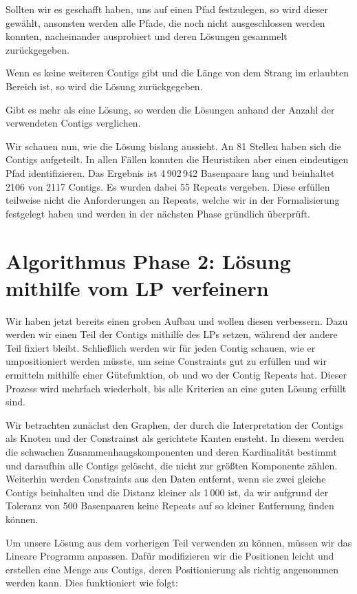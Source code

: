 Sollten wir es geschafft haben, uns auf einen Pfad festzulegen, so wird dieser gewählt, ansonsten werden alle Pfade, die noch nicht ausgeschlossen werden konnten, nacheinander ausprobiert und deren Lösungen gesammelt zurückgegeben.

Wenn es keine weiteren Contigs gibt und die Länge von dem Strang im erlaubten Bereich ist, so wird die Lösung zurückgegeben.

Gibt es mehr als eine Lösung, so werden die Lösungen anhand der Anzahl der verwendeten Contigs verglichen. 

Wir schauen nun, wie die Lösung bislang aussieht. An 81 Stellen haben sich die Contigs aufgeteilt. In allen Fällen konnten die Heuristiken aber einen eindeutigen Pfad identifizieren. Das Ergebnis ist 4\,902\,942 Basenpaare lang und beinhaltet 2106 von 2117 Contigs. Es wurden dabei 55 Repeats vergeben. Diese erfüllen teilweise nicht die Anforderungen an Repeats, welche wir in der Formalisierung festgelegt haben und werden in der nächsten Phase gründlich überprüft.


\chapter{Algorithmus Phase 2: Lösung mithilfe vom LP verfeinern}\raggedbottom 
Wir haben jetzt bereits einen groben Aufbau und wollen diesen verbessern. Dazu werden wir einen Teil der Contigs mithilfe des LPs setzen, während der andere Teil fixiert bleibt. Schließlich werden wir für jeden Contig schauen, wie er umpositioniert werden müsste, um seine Constraints gut zu erfüllen und wir ermitteln mithilfe einer Gütefunktion, ob und wo der Contig Repeats hat. Dieser Prozess wird mehrfach wiederholt, bis alle Kriterien an eine guten Lösung erfüllt sind.

Wir betrachten zunächst den Graphen, der durch die Interpretation der Contigs als Knoten und der Constrainst als gerichtete Kanten ensteht. In diesem werden die schwachen Zusammenhangskomponenten und deren Kardinalität bestimmt und daraufhin alle Contigs gelöscht, die nicht zur größten Komponente zählen.
Weiterhin werden Constraints aus den Daten entfernt, wenn sie zwei gleiche Contigs beinhalten und die Distanz kleiner als 1\,000 ist, da wir aufgrund der Toleranz von 500 Basenpaaren keine Repeats auf so kleiner Entfernung finden können.

Um unsere Lösung aus dem vorherigen Teil verwenden zu können, müssen wir das Lineare Programm anpassen. Dafür modifizieren wir die Positionen leicht und erstellen eine Menge aus Contigs, deren Positionierung als richtig angenommen werden kann. Dies funktioniert wie folgt:


